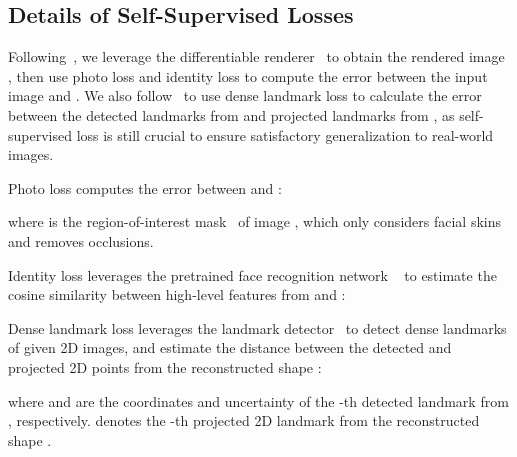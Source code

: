 \subsection{Details of Self-Supervised Losses}
Following~, we leverage the differentiable renderer~ to obtain the rendered image , then use photo loss  and identity loss  to compute the error between the input image  and . We also follow~ to use dense landmark loss  to calculate the error between the detected landmarks from  and projected landmarks from , as self-supervised loss is still crucial to ensure satisfactory generalization to real-world images.


Photo loss  computes the  error between  and :

where  is the region-of-interest mask~ of image , which only considers facial skins and removes occlusions.

Identity loss  leverages the pretrained face recognition network ~ to estimate the cosine similarity between high-level features from  and :


Dense landmark loss  leverages the landmark detector~ to detect  dense landmarks of given 2D images, and estimate the distance between the detected and projected 2D points from the reconstructed shape :

where  and  are the coordinates and uncertainty of the -th detected landmark from , respectively.  denotes the -th projected 2D landmark from the reconstructed shape .




